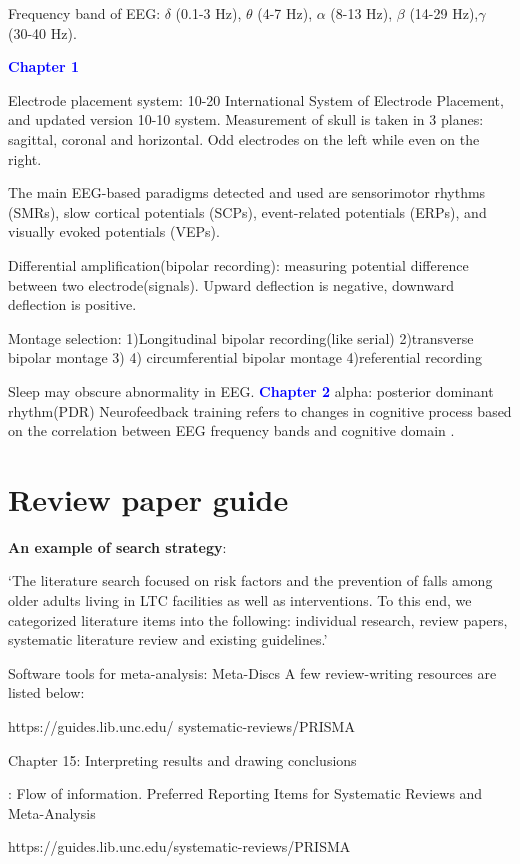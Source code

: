 \documentclass{article}
\begin{document}
Frequency band of EEG: $\delta$ (0.1-3 Hz), $\theta$ (4-7 Hz), $\alpha$ (8-13 Hz), $\beta$ (14-29 Hz),$\gamma$ (30-40 Hz).

\textcolor{blue}{\textbf{Chapter 1}}


Electrode placement system: 10-20 International System of Electrode Placement, and updated version 10-10 system. Measurement of skull is taken in 3 planes: sagittal, coronal and horizontal. Odd electrodes on the left while even on the right.

The main EEG-based paradigms detected and used are sensorimotor rhythms (SMRs), slow cortical potentials (SCPs), event-related potentials (ERPs), and visually evoked potentials (VEPs).

Differential amplification(bipolar recording): measuring potential difference between two electrode(signals). Upward deflection is negative, downward deflection is positive.

Montage selection:
1)Longitudinal bipolar recording(like serial) 2)transverse bipolar montage 3) 4) circumferential bipolar montage 4)referential recording

Sleep may obscure abnormality in EEG. 
\textcolor{blue}{\textbf{Chapter 2}}
alpha: posterior dominant rhythm(PDR)
Neurofeedback training refers to changes in cognitive process based on the correlation between EEG frequency bands and cognitive domain \cite{Lecomte_2011}. 
\section{Review paper guide}

\textbf{An example of search strategy}: 

‘The literature search focused on risk factors and the prevention of falls among older adults living in LTC facilities as well as interventions. To this end, we categorized literature items into the following: individual research, review papers, systematic literature review and existing guidelines.’

Software tools for  meta-analysis: Meta-Discs
A few review-writing resources are listed below: \par
https://guides.lib.unc.edu/
systematic-reviews/PRISMA

\begin{description}[font=$\bullet$~\normalfont\textbf]
\item [Cochrane Handbook:] Chapter 15: Interpreting results and drawing conclusions
\item [PRISMA]: Flow of information. Preferred Reporting Items for Systematic Reviews and Meta-Analysis
\item [JBI Manual for Evidence Synthesis - Chapter 12.3 The systematic review] 
\end{description}
https://guides.lib.unc.edu/systematic-reviews/PRISMA
\end{document}
